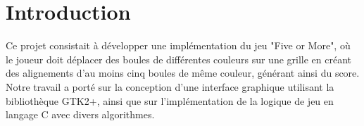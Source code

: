 \section{Introduction}\label{introduction}

Ce projet consistait à développer une implémentation du jeu "Five or More", 
où le joueur doit déplacer des boules de différentes couleurs sur une grille en créant des 
alignements d'au moins cinq boules de même couleur, générant ainsi du score. 
Notre travail a porté sur la conception d'une interface graphique 
utilisant la bibliothèque GTK2+, ainsi que sur l'implémentation de la logique 
de jeu en langage C avec divers algorithmes.